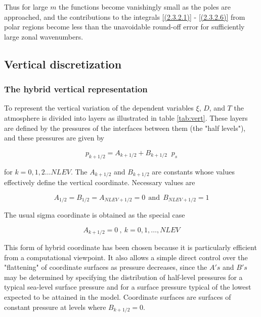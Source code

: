 Thus for large $m$ the functions become vanishingly small as the poles are
approached, and the contributions to the integrals \ref{(2.3.2.1)} -
\ref{(2.3.2.6)} from polar regions become less than the unavoidable
round-off error for sufficiently large zonal wavenumbers.

\subsection{\label{sec:verdis}Vertical discretization} 

\subsubsection{The hybrid vertical representation} 

To represent the vertical variation of the dependent variables $\xi$,
$D$, and $T$ the atmosphere is divided into layers as illustrated in
table \ref{tab:vert}. These layers are defined by the pressures of the
interfaces between them (the "half levels"), and these pressures are
given by

\begin{equation}
p_{k+1/2} = A_{k+1/2} + B_{k+1/2} \;\; p_s
\label{(2.4.1.1)}
\end{equation}


for $k = 0,1,2\dots NLEV$. The $A_{k+1/2}$ and $B_{k+1/2}$ are constants 
whose values effectively define the vertical coordinate.
Necessary values are

\begin{equation}
A_{1/2} = B_{1/2} = A_{NLEV+1/2} = 0 \ \ \mbox{and} \ \ B_{NLEV+1/2} = 1
\label{(2.4.1.2)}
\end{equation}

The usual sigma coordinate is obtained as the special case

\begin{equation}
 A_{k+1/2} = 0 \ , \ k = 0,1,\ldots, NLEV
\label{(2.4.1.3)}
\end{equation}

This form of hybrid coordinate has been chosen because it is
particularly efficient from a computational viewpoint. It
also allows a simple direct control over the "flattening" of
coordinate surfaces as pressure decreases, since the $A's$ and $B's$ may
be determined by specifying the distribution of half-level
pressures for a typical sea-level surface pressure and for a
surface pressure typical of the lowest expected to be
attained in the model. Coordinate surfaces are surfaces of
constant pressure at levels where $B_{k+1/2} = 0$.


